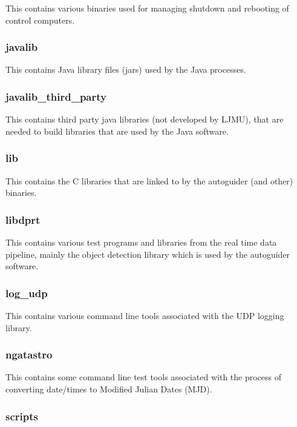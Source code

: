 \documentclass[10pt,a4paper]{article}
\begin{document}
This contains various binaries used for managing shutdown and rebooting of control computers.

\subsubsection{javalib}

This contains Java library files (jars) used by the Java processes.

\subsubsection{javalib\_third\_party}

This contains third party java libraries (not developed by LJMU), that are needed to build libraries that are
used by the Java software.

\subsubsection{lib}

This contains the C libraries that are linked to by the autoguider (and other) binaries.

\subsubsection{libdprt}

This contains various test programs and libraries from the real time data pipeline, mainly the object detection library which is used by the autoguider software.

\subsubsection{log\_udp}

This contains various command line tools associated with the UDP logging library.

\subsubsection{ngatastro}

This contains some command line test tools associated with the process of converting date/times to Modified Julian Dates (MJD).

\subsubsection{scripts}
\end{document}
